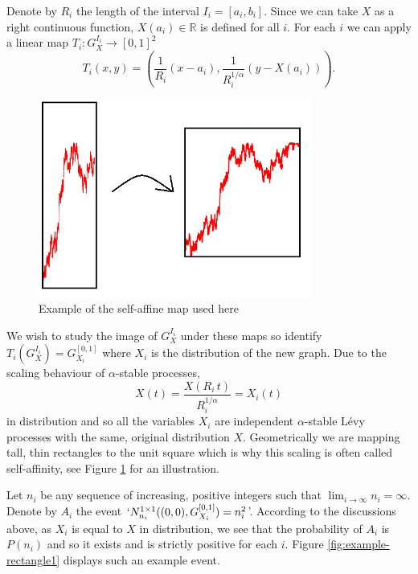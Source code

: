 Denote by $R_i$ the length of the interval $I_i=[a_i,b_i]$. Since we can take $X$ as a right continuous function, $X(a_i)\in\mathbb{R}$ is defined for all $i$. For each $i$ we can apply a linear map $T_i: G_X^{I_i} \rightarrow [0,1]^2$
\[
T_i(x,y)=\left(\frac{1}{R_i}(x-a_i),\frac{1}{R_i^{1/\alpha}}\left(y-X(a_i)\right)\right).
\]

\begin{figure}[ht]
    \centering
    \includegraphics[width=0.8\textwidth]{pics/ch-brownian/memes-map.png}
    \caption{Example of the self-affine map used here}
    \label{fig:rectangles-graph}
\end{figure}

We wish to study the image of $G_X^{I_i}$ under these maps so identify $T_i(G_X^{I_i})=G_{X_i}^{[0,1]}$ where $X_i$ is the distribution of the new graph. Due to the scaling behaviour of $\alpha$-stable processes, 
\[
X(t) = \frac{X(R_i\, t)}{R_i^{1/\alpha}} = X_i(t)
\]
in distribution and so all the variables $X_i$ are independent $\alpha$-stable L\'evy processes with the same, original distribution $X$. Geometrically we are mapping tall, thin rectangles to the unit square which is why this scaling is often called self-affinity, see Figure \ref{fig:rectangles-graph} for an illustration. 

Let $n_i$ be any sequence of increasing, positive integers such that $\lim_{i\to\infty} n_i=\infty$. Denote by $A_i$ the event $`N_{n_i}^{1 \times 1 }((0,0),G_{X_i}^{[0,1]})=n_i^2 $'. According to the discussions above, as $X_i$ is equal to $X$ in distribution, we see that the probability of $A_i$ is $P(n_i)$ and so it exists and is strictly positive for each $i$. Figure \ref{fig:example-rectangle1} displays such an example event. 

